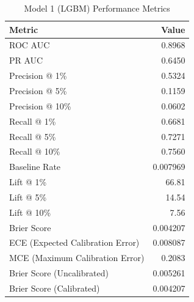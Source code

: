 \begin{table}[h]
\centering
\begin{tabular}{lr}
\toprule
Metric & Value \\
\midrule
ROC AUC & 0.8968 \\
PR AUC & 0.6450 \\
Precision @ 1\% & 0.5324 \\
Precision @ 5\% & 0.1159 \\
Precision @ 10\% & 0.0602 \\
Recall @ 1\% & 0.6681 \\
Recall @ 5\% & 0.7271 \\
Recall @ 10\% & 0.7560 \\
Baseline Rate & 0.007969 \\
Lift @ 1\% & 66.81 \\
Lift @ 5\% & 14.54 \\
Lift @ 10\% & 7.56 \\
Brier Score & 0.004207 \\
ECE (Expected Calibration Error) & 0.008087 \\
MCE (Maximum Calibration Error) & 0.2083 \\
Brier Score (Uncalibrated) & 0.005261 \\
Brier Score (Calibrated) & 0.004207 \\
\bottomrule
\end{tabular}
\caption{Model 1 (LGBM) Performance Metrics}
\label{tab:model1_lgbm_metrics}
\end{table}
